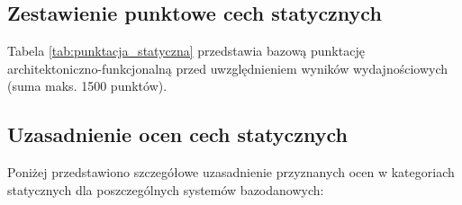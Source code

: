 \subsection{Zestawienie punktowe cech statycznych}

Tabela \ref{tab:punktacja_statyczna} przedstawia bazową punktację architektoniczno-funkcjonalną przed uwzględnieniem wyników wydajnościowych (suma maks. 1500 punktów).

\begin{table}[H]
\centering
{}
\caption{Zestawienie punktowe cech statycznych badanych systemów}
\label{tab:punktacja_statyczna}
\end{table}

\subsection{Uzasadnienie ocen cech statycznych}

Poniżej przedstawiono szczegółowe uzasadnienie przyznanych ocen w kategoriach statycznych dla poszczególnych systemów bazodanowych:

